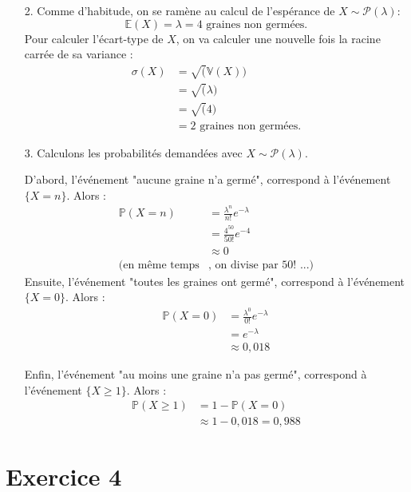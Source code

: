 \documentclass[a4paper,oneside,12pt]{article}
\theoremstyle{plain}
\def\V{\mathbb{V}}
\def\P{{\mathbb P}}
\def\E{{\mathbb E}}
\begin{document}
\begin{enumerate}
    \item[2.] Comme d'habitude, on se ramène au calcul de l'espérance de $X \sim \mathcal{P}(\lambda)$:
    $$\E(X) = \lambda = 4 \mbox{ graines non germées.}$$
    Pour calculer l'écart-type de $X$, on va calculer une nouvelle fois la racine carrée de sa variance :
   \begin{align*}
       \sigma(X) &= \sqrt(\V(X)) \\
       &= \sqrt(\lambda)\\
       &= \sqrt(4)\\
       &= 2 \mbox{ graines non germées.}
   \end{align*}
   
   \item[3.] Calculons les probabilités demandées avec $X \sim \mathcal{P}(\lambda)$. 
   


    D'abord, l'événement "aucune graine n'a germé", correspond à l'événement $\{X = n\}$. Alors :
   \begin{align*}
       \P(X = n) &= \frac{\lambda^n}{n!}e^{-\lambda}\\
       &= \frac{4^{50}}{50!}e^{-4}\\
       &\approx 0\\
       \mbox{(en même temps}&\mbox{, on divise par } 50! \mbox{ ...)}
   \end{align*}
   Ensuite, l'événement "toutes les graines ont germé", correspond à l'événement $\{X = 0\}$. Alors :
   \begin{align*}
       \P(X = 0) &= \frac{\lambda^0}{0!}e^{-\lambda}\\
       &= e^{-\lambda}\\
       &\approx 0,018
   \end{align*}
   
   Enfin, l'événement "au moins une graine n'a pas germé", correspond à l'événement $\{X \ge 1\}$. Alors :
   \begin{align*}
       \P(X \ge 1) &= 1 - \P(X =0) \\
       &\approx 1- 0,018 = 0,988
   \end{align*}
\end{enumerate}


\section*{Exercice 4}
\end{document}
